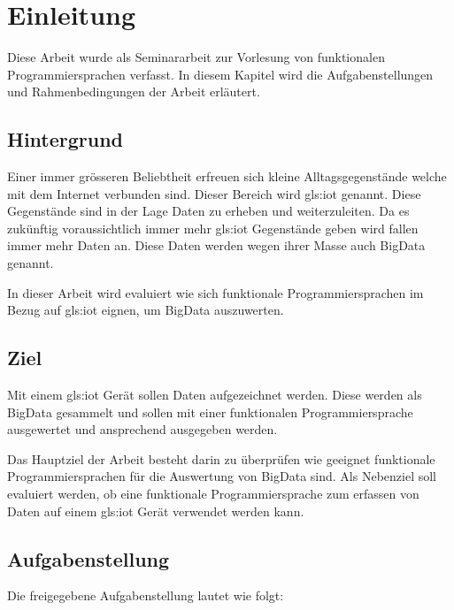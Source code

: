 
\chapter{Einleitung}
Diese Arbeit wurde als Seminararbeit zur Vorlesung von funktionalen Programmiersprachen verfasst.
In diesem Kapitel wird die Aufgabenstellungen und Rahmenbedingungen der Arbeit erläutert.

\section{Hintergrund}
Einer immer grösseren Beliebtheit erfreuen sich kleine Alltagsgegenstände welche mit dem Internet verbunden sind. Dieser Bereich wird \Gls{gls:iot} genannt. Diese Gegenstände sind in der Lage Daten zu erheben und weiterzuleiten. Da es zukünftig voraussichtlich immer mehr \Gls{gls:iot} Gegenstände geben wird fallen immer mehr Daten an. 
Diese Daten werden wegen ihrer Masse auch BigData genannt.

In dieser Arbeit wird evaluiert wie sich funktionale Programmiersprachen im Bezug auf \Gls{gls:iot} eignen, um BigData auszuwerten.


\section{Ziel}
Mit einem \Gls{gls:iot} Gerät sollen Daten aufgezeichnet werden. Diese werden als BigData gesammelt und sollen mit einer funktionalen Programmiersprache ausgewertet und ansprechend ausgegeben werden.

Das Hauptziel der Arbeit besteht darin zu überprüfen wie geeignet funktionale Programmiersprachen für die Auswertung von BigData sind. Als Nebenziel soll evaluiert werden, ob eine funktionale Programmiersprache zum erfassen von Daten auf einem \Gls{gls:iot} Gerät verwendet werden kann.

\section{Aufgabenstellung} \label{sec:Aufgabenstellung}
Die freigegebene Aufgabenstellung lautet wie folgt:

